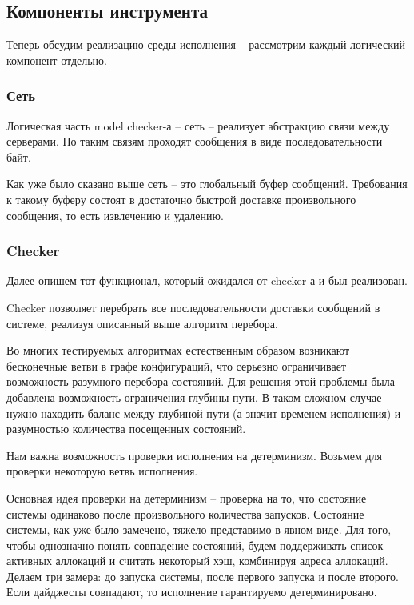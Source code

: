 \subsection{Компоненты инструмента}

Теперь обсудим реализацию среды исполнения – рассмотрим каждый логический компонент отдельно.

\subsubsection{Сеть}

Логическая часть model checker-а – сеть – реализует абстракцию связи между серверами. По таким связям проходят сообщения в виде последовательности байт.

Как уже было сказано выше сеть – это глобальный буфер сообщений. Требования к такому буферу состоят в достаточно быстрой доставке произвольного сообщения, то есть извлечению и удалению. 

\subsubsection{Checker}

Далее опишем тот функционал, который ожидался от checker-а и был реализован.

Checker позволяет перебрать все последовательности доставки сообщений в системе, реализуя описанный выше алгоритм перебора.

Во многих тестируемых алгоритмах естественным образом возникают бесконечные ветви в графе конфигураций, что серьезно ограничивает возможность разумного перебора состояний. Для решения этой проблемы была добавлена возможность ограничения глубины пути. В таком сложном случае нужно находить баланс между глубиной пути (а значит временем исполнения) и разумностью количества посещенных состояний.

Нам важна возможность проверки исполнения на детерминизм. Возьмем для проверки некоторую ветвь исполнения.

Основная идея проверки на детерминизм – проверка на то, что состояние системы одинаково после произвольного количества запусков. Состояние системы, как уже было замечено, тяжело представимо в явном виде. Для того, чтобы однозначно понять совпадение состояний, будем поддерживать список активных аллокаций и считать некоторый хэш, комбинируя адреса аллокаций. Делаем три замера: до запуска системы, после первого запуска и после второго. Если дайджесты совпадают, то исполнение гарантируемо детерминировано.

